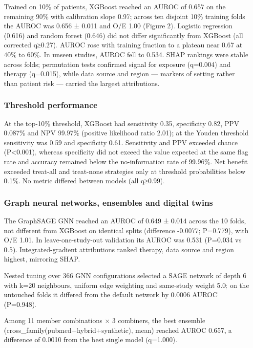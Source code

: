 \documentclass[
  11pt,
]{article}
\begin{document}
Trained on 10\% of patients, XGBoost reached an AUROC of 0.657 on the
remaining 90\% with calibration slope 0.97; across ten disjoint 10\%
training folds the AUROC was 0.656 ± 0.011 and O/E 1.00 (Figure 2).
Logistic regression (0.616) and random forest (0.646) did not differ
significantly from XGBoost (all corrected q≥0.27). AUROC rose with
training fraction to a plateau near 0.67 at 40\% to 60\%. In unseen
studies, AUROC fell to 0.534. SHAP rankings were stable across folds;
permutation tests confirmed signal for exposure (q=0.004) and therapy
(q=0.015), while data source and region --- markers of setting rather
than patient risk --- carried the largest attributions.

\subsubsection{Threshold performance}\label{threshold-performance}

At the top-10\% threshold, XGBoost had sensitivity 0.35, specificity
0.82, PPV 0.087\% and NPV 99.97\% (positive likelihood ratio 2.01); at
the Youden threshold sensitivity was 0.59 and specificity 0.61.
Sensitivity and PPV exceeded chance (P\textless0.001), whereas
specificity did not exceed the value expected at the same flag rate and
accuracy remained below the no-information rate of 99.96\%. Net benefit
exceeded treat-all and treat-none strategies only at threshold
probabilities below 0.1\%. No metric differed between models (all
q≥0.99).

\subsubsection{Graph neural networks, ensembles and digital
twins}\label{graph-neural-networks-ensembles-and-digital-twins}

The GraphSAGE GNN reached an AUROC of 0.649 ± 0.014 across the 10 folds,
not different from XGBoost on identical splits (difference -0.0077;
P=0.779), with O/E 1.01. In leave-one-study-out validation its AUROC was
0.531 (P=0.034 vs 0.5). Integrated-gradient attributions ranked therapy,
data source and region highest, mirroring SHAP.

Nested tuning over 366 GNN configurations selected a SAGE network of
depth 6 with k=20 neighbours, uniform edge weighting and same-study
weight 5.0; on the untouched folds it differed from the default network
by 0.0006 AUROC (P=0.948).

Among 11 member combinations × 3 combiners, the best ensemble
(cross\_family(pubmed+hybrid+synthetic), mean) reached AUROC 0.657, a
difference of 0.0010 from the best single model (q=1.000).
\end{document}
